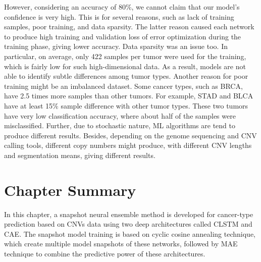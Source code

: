 \hspace*{3.5mm} However, considering an accuracy of 80\%, we cannot claim that our model’s confidence is very high. This is for several reasons, such as lack of training samples, poor training, and data sparsity. The latter reason caused each network to produce high training and validation loss of error optimization during the training phase, giving lower accuracy. Data sparsity was an issue too. In particular, on average, only 422 samples per tumor were used for the training, which is fairly low for such high-dimensional data. As a result, models are not able to identify subtle differences among tumor types. 
Another reason for poor training might be an imbalanced dataset. Some cancer types, such as BRCA, have 2.5 times more samples than other tumors. For example, STAD and BLCA have at least 15\% sample difference with other tumor types. These two tumors have very low classification accuracy, where about half of the samples were misclassified. Further, due to stochastic nature, ML algorithms are tend to produce different results. Besides, depending on the genome sequencing and CNV calling tools, different copy numbers might produce, with different CNV lengths and segmentation means, giving different results.

\section{Chapter Summary} \label{chapter_3:conclusion}
In this chapter, a snapshot neural ensemble method is developed for cancer-type prediction based on CNVs data using two deep architectures called CLSTM and CAE. The snapshot model training is based on cyclic cosine annealing technique, which create multiple model snapshots of these networks, followed by MAE technique to combine the predictive power of these architectures.  


